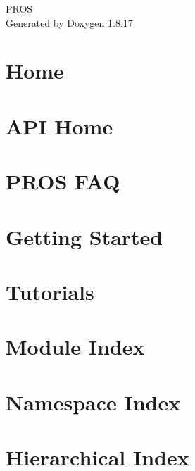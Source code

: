 \let\mypdfximage\pdfximage\def\pdfximage{\immediate\mypdfximage}\documentclass[twoside]{book}
\newcommand{\+}{\discretionary{\mbox{\scriptsize$\hookleftarrow$}}{}{}}
\newcommand{\clearemptydoublepage}{%
  \newpage{\pagestyle{empty}\cleardoublepage}%
}
\begin{document}
\hypersetup{pageanchor=false,
             bookmarksnumbered=true,
             pdfencoding=unicode
            }
\begin{titlepage}
\vspace*{7cm}
\begin{center}%
{\Large P\+R\+OS }\\
\vspace*{1cm}
{\large Generated by Doxygen 1.8.17}\\
\end{center}
\end{titlepage}
\clearemptydoublepage
{}
\tableofcontents
\clearemptydoublepage
{}
\hypersetup{pageanchor=true}

\chapter{Home}
\label{index}\hypertarget{index}{}
\chapter{A\+PI Home}
\label{api}

\chapter{P\+R\+OS F\+AQ}
\label{md_docs_getting-started_faq}

\chapter{Getting Started}
\label{getting-started}

\chapter{Tutorials}
\label{tutorials}

\chapter{Module Index}

\chapter{Namespace Index}

\chapter{Hierarchical Index}

\end{document}
